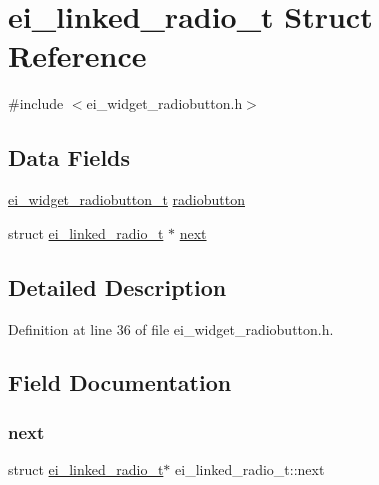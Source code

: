 \hypertarget{structei__linked__radio__t}{}\section{ei\+\_\+linked\+\_\+radio\+\_\+t Struct Reference}
\label{structei__linked__radio__t}


{\ttfamily \#include $<$ei\+\_\+widget\+\_\+radiobutton.\+h$>$}

\subsection*{Data Fields}
\begin{DoxyCompactItemize}
\item 
\hyperlink{structei__widget__radiobutton__t}{ei\+\_\+widget\+\_\+radiobutton\+\_\+t} \hyperlink{structei__linked__radio__t_a74ad6c1257741677c69e215d06809b55}{radiobutton}
\item 
struct \hyperlink{structei__linked__radio__t}{ei\+\_\+linked\+\_\+radio\+\_\+t} $\ast$ \hyperlink{structei__linked__radio__t_aeef19ff2cc6130e47449b1c225a6c3f3}{next}
\end{DoxyCompactItemize}


\subsection{Detailed Description}


Definition at line 36 of file ei\+\_\+widget\+\_\+radiobutton.\+h.



\subsection{Field Documentation}
\mbox{\label{structei__linked__radio__t_aeef19ff2cc6130e47449b1c225a6c3f3}} 
\subsubsection{\texorpdfstring{next}{next}}
{\footnotesize\ttfamily struct \hyperlink{structei__linked__radio__t}{ei\+\_\+linked\+\_\+radio\+\_\+t}$\ast$ ei\+\_\+linked\+\_\+radio\+\_\+t\+::next}



